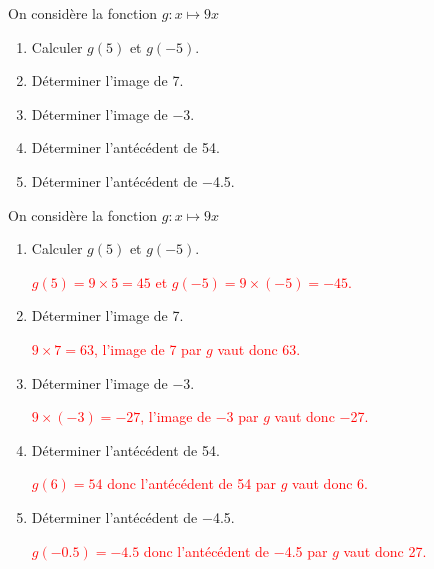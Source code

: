\begin{exercice*}
    On considère la fonction $g:x\longmapsto 9x$
    \begin{enumerate}
        \item Calculer $g(5)$ et $g(-5)$.
        \item Déterminer l'image de \num{7}.
        \item Déterminer l'image de \num{-3}.
        \item Déterminer l'antécédent de \num{54}.
        \item Déterminer l'antécédent de \num{-4.5}.
    \end{enumerate}
\end{exercice*}
\begin{corrige}
    On considère la fonction $g:x\longmapsto 9x$
    
    \begin{enumerate}
        \item Calculer $g(5)$ et $g(-5)$.
        
        \textcolor{red}{$g(5)=9\times 5 = 45$ et $g(-5)=9\times (-5)=-45$.}
        \item Déterminer l'image de \num{7}.
        
        \textcolor{red}{$9\times 7=63$, l'image de 7 par $g$ vaut donc 63.}
        \item Déterminer l'image de \num{-3}.
        
        \textcolor{red}{$9\times (-3)=-27$, l'image de \num{-3} par $g$ vaut donc \num{-27}.}
        \item Déterminer l'antécédent de \num{54}.
        
        \textcolor{red}{$g(6)=54$ donc l'antécédent de \num{54} par $g$ vaut donc \num{6}.}
        \item Déterminer l'antécédent de \num{-4.5}.
        
        \textcolor{red}{$g(\num{-0.5})=\num{-4.5}$ donc l'antécédent de \num{-4.5} par $g$ vaut donc \num{27}.}
    \end{enumerate}
\end{corrige}

